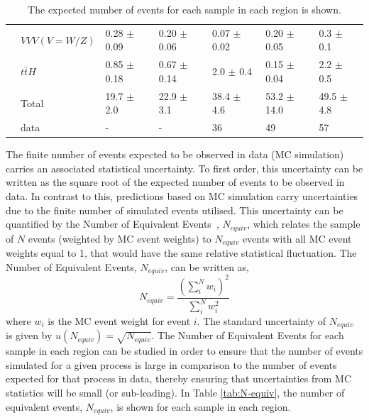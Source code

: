 \begin{table}[h!]
{\begin{tabular}{|ll|l|l|l|l|l|}
\multicolumn{1}{|l|}{}                       & $VVV (V = W/Z)$           & 0.28 $\pm$ 0.09     & 0.20 $\pm$ 0.06    & 0.07 $\pm$ 0.02  & 0.20 $\pm$ 0.05   & 0.3 $\pm$ 0.1   \\
\multicolumn{1}{|l|}{}                       & $t\bar{t}H$          & 0.85 $\pm$ 0.18       & 0.67 $\pm$ 0.14     & 2.0 $\pm$ 0.4     & 0.15 $\pm$ 0.04    & 2.2 $\pm$ 0.5      \\ \hline
                                             & Total        & 19.7 $\pm$ 2.0         & 22.9 $\pm$ 3.1       & 38.4 $\pm$ 4.6       & 53.2 $\pm$ 14.0       & 49.5 $\pm$ 4.8      \\ \hline
                                             & data         & -                                         & -                                       & 36                                      & 49                                       & 57                                      \\ \hline
\end{tabular}}
\caption{The expected number of events for each sample in each region is shown.}
\label{tab:4Lep-PreFit-Yields}
\end{table}The finite number of events expected to be observed in data (MC simulation) carries an associated statistical uncertainty. To first order, this uncertainty can be written as the square root of the expected number of events to be observed in data. In contrast to this, predictions based on MC simulation carry uncertainties due to the finite number of simulated events utilised. This uncertainty can be quantified by the Number of Equivalent Events~\cite{N_equiv_Derivation}, $N_{equiv}$, which relates the sample of $N$ events (weighted by MC event weights) to $N_{equiv}$ events with all MC event weights equal to 1, that would have the same relative statistical fluctuation. The Number of Equivalent Events, $N_{equiv}$, can be written as,
\begin{equation}
N_{equiv} = \frac{ (\sum_{i}^{N} w_{i})^2  }{\sum_{i}^{N} w_i^2 }
\end{equation}
where $w_i$ is the MC event weight for event $i$. The standard uncertainty of $N_{equiv}$ is given by $u(N_{equiv}) = \sqrt{N_{equiv}}$. The Number of Equivalent Events for each sample in each region can be studied in order to ensure that the number of events simulated for a given process is large in comparison to the number of events expected for that process in data, thereby ensuring that uncertainties from MC statistics will be small (or sub-leading). In Table \ref{tab:N-equiv}, the number of equivalent events, $N_{equiv}$, is shown for each sample in each region. 
